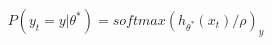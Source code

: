 \documentclass[preview]{standalone}
\begin{document}
\begin{align*}
P(y_t = y | \theta^*) = softmax(h_{\theta^*}(x_t)/\rho)_y
\end{align*}
\end{document}
